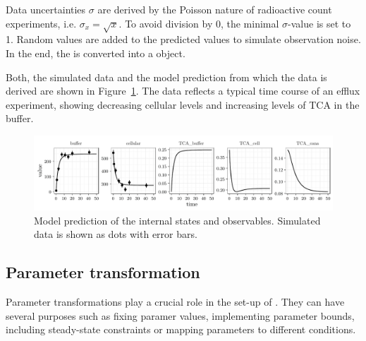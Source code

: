 \documentclass[article]{jss}
\begin{document}
Data uncertainties $\sigma$ are derived by the Poisson nature of radioactive count experiments, i.e. $\sigma_x = \sqrt{x}$. To avoid division by 0, the minimal $\sigma$-value is set to 1. Random values are added to the predicted values to simulate observation noise. In the end, the  is converted into a  object.
\begin{CodeChunk}
\end{CodeChunk}
Both, the simulated data and the model prediction from which the data is derived are shown in Figure~\ref{fig:observation}. The data reflects a typical time course of an efflux experiment, showing decreasing cellular levels and increasing levels of TCA in the buffer.
\begin{figure}[ht]
	\centering
	\includegraphics[width = \textwidth]{images/figure2}
	\caption{Model prediction of the internal states and observables. Simulated data is shown as dots with error bars.}
	\label{fig:observation}
\end{figure}

\subsection{Parameter transformation}
Parameter transformations play a crucial role in the set-up of . They can have several purposes such as fixing paramer values, implementing parameter bounds, including steady-state constraints or mapping parameters to different conditions.
\end{document}
